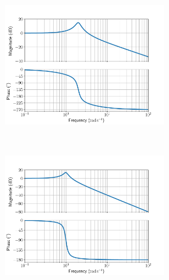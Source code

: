 \documentclass[titlepage, 11pt, reqno]{article}    %
\begin{document}
\begin{figure}[h]
    \centering
    \begin{subfigure}{0.49\textwidth}
        \centering
        \begin{subfigure}[htbp]{\textwidth} 
            \includegraphics[width=\textwidth]{figures/G3_bode.pdf} 
        \end{subfigure}\\
        \begin{subfigure}[htbp]{\textwidth} 
            \includegraphics[width=\textwidth]{figures/G1_bode.pdf} 
        \end{subfigure} \\
        \begin{subfigure}[htbp]{\textwidth} 

\end{subfigure}
\end{subfigure}
\end{figure}
\end{document}
